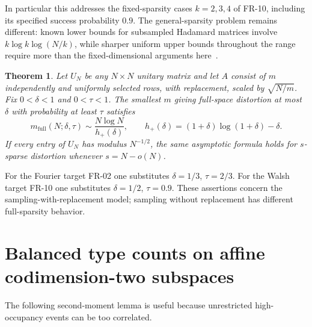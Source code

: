 \documentclass[11pt]{article}
\newtheorem{theorem}{Theorem}\newtheorem{lemma}[theorem]{Lemma}
\theoremstyle{remark}\newtheorem{remark}[theorem]{Remark}
\begin{document}
In particular this addresses the fixed-sparsity cases $k=2,3,4$ of FR-10, including its specified success probability $0.9$. The general-sparsity problem remains different: known lower bounds for subsampled Hadamard matrices involve $k\log k\log(N/k)$, while sharper uniform upper bounds throughout the range require more than the fixed-dimensional arguments here~\cite{BLM,HR}.

\begin{theorem}\label{thm:full}
Let $U_N$ be any $N\times N$ unitary matrix and let $A$ consist of $m$ independently and uniformly selected rows, with replacement, scaled by $\sqrt{N/m}$. Fix $0<\delta<1$ and $0<\tau<1$. The smallest $m$ giving full-space distortion at most $\delta$ with probability at least $\tau$ satisfies
\[
 m_{\mathrm{full}}(N;\delta,\tau)\sim
 \frac{N\log N}{h_+(\delta)},\qquad
 h_+(\delta)=(1+\delta)\log(1+\delta)-\delta.
\]
If every entry of $U_N$ has modulus $N^{-1/2}$, the same asymptotic formula holds for $s$-sparse distortion whenever $s=N-o(N)$.
\end{theorem}

For the Fourier target FR-02 one substitutes $\delta=1/3$, $\tau=2/3$. For the Walsh target FR-10 one substitutes $\delta=1/2$, $\tau=0.9$. These assertions concern the sampling-with-replacement model; sampling without replacement has different full-sparsity behavior.

\section{Balanced type counts on affine codimension-two subspaces}
The following second-moment lemma is useful because unrestricted high-occupancy events can be too correlated.
\end{document}
